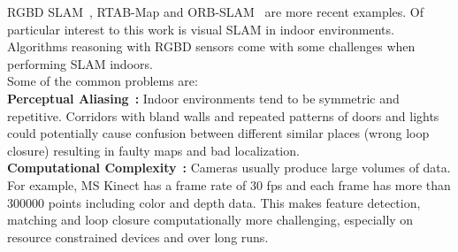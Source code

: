 RGBD SLAM~\cite{burgard:rgbd-slam}, RTAB-Map \cite{rtabmap} and ORB-SLAM~\cite{orbslam} are more recent examples. 
Of particular interest to this work is visual SLAM in indoor environments.
Algorithms reasoning with RGBD sensors come with some challenges when performing SLAM indoors. \\
Some of the common problems are:\\
\textbf{Perceptual Aliasing}~\cite{perceptual_aliasing1,visual_wifi_2}\textbf{:} Indoor environments tend to be symmetric and repetitive. Corridors with bland walls and repeated patterns of doors and lights could potentially cause confusion between different similar places (wrong loop closure) resulting in faulty maps and bad localization. \\
\textbf{Computational Complexity}~\cite{computational_complexity1,memory_management2}\textbf{:} Cameras usually produce large volumes of data. 
For example, MS Kinect has a frame rate of 30 fps and each frame has more than 300000 points including color and depth data. 
This makes feature detection, matching and loop closure computationally more challenging, especially on resource constrained devices and over long runs.

